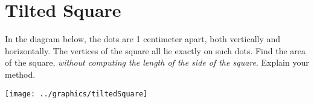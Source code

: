 \newpage

\section{Tilted Square}


\begin{prob}
In the diagram below, the dots are 1 centimeter apart, both vertically and horizontally.  The vertices of the square all lie exactly on such dots. Find the area of the square, \emph{without computing the length of the side of the square}.  Explain your method.  

\texttt{[image: ../graphics/tiltedSquare]}

\end{prob}
